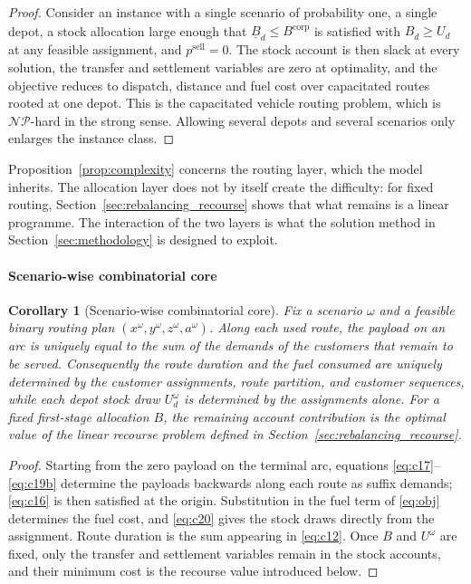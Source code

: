 \documentclass[authoryear,final,3p,times]{elsarticle}
\newtheorem{corollary}{Corollary}
\theoremstyle{definition}
\theoremstyle{plain}
\begin{document}
\begin{proof}
Consider an instance with a single scenario of probability one, a single
depot, a stock allocation large enough that
$\underline B_d\le B^{\mathrm{corp}}$ is satisfied with
$B_d^{\phantom{|}}\ge U_d$ at any feasible assignment, and
$p^{\mathrm{sell}}=0$. The stock account is then slack at every solution,
the transfer and settlement variables are zero at optimality, and the objective
reduces to dispatch, distance and fuel cost over capacitated routes rooted at
one depot. This is the capacitated vehicle routing problem, which is
$\mathcal{NP}$-hard in the strong sense. Allowing several depots and several
scenarios only enlarges the instance class.
\end{proof}

Proposition~\ref{prop:complexity} concerns the routing layer, which the model
inherits. The allocation layer does not by itself create the difficulty: for
fixed routing, Section~\ref{sec:rebalancing_recourse} shows that what remains is a
linear programme. The interaction of the two layers is what the solution
method in Section~\ref{sec:methodology} is designed to exploit.

\paragraph{Scenario-wise combinatorial core}
\label{subsec:reduction}

\begin{corollary}[Scenario-wise combinatorial core]
\label{cor:core}
Fix a scenario $\omega$ and a feasible binary routing plan
$(x^\omega,y^\omega,z^\omega,a^\omega)$.  Along each used route, the payload on
an arc is uniquely equal to the sum of the demands of the customers that
remain to be served.  Consequently the route duration and the fuel consumed
are uniquely determined by the customer assignments, route partition, and
customer sequences, while each depot stock draw $U_d^\omega$ is determined by
the assignments alone.  For a fixed first-stage allocation $B$, the remaining
account contribution is the optimal value of the linear recourse problem
defined in Section~\ref{sec:rebalancing_recourse}.
\end{corollary}

\begin{proof}
Starting from the zero payload on the terminal arc, equations
\eqref{eq:c17}--\eqref{eq:c19b} determine the payloads backwards along each
route as suffix demands; \eqref{eq:c16} is then satisfied at the origin.
Substitution in the fuel term of \eqref{eq:obj} determines the fuel cost, and
\eqref{eq:c20} gives the stock draws directly from the assignment.  Route
duration is the sum appearing in \eqref{eq:c12}.  Once $B$ and $U^\omega$ are
fixed, only the transfer and settlement variables remain in the stock accounts,
and their minimum cost is the recourse value introduced below.
\end{proof}
\end{document}
